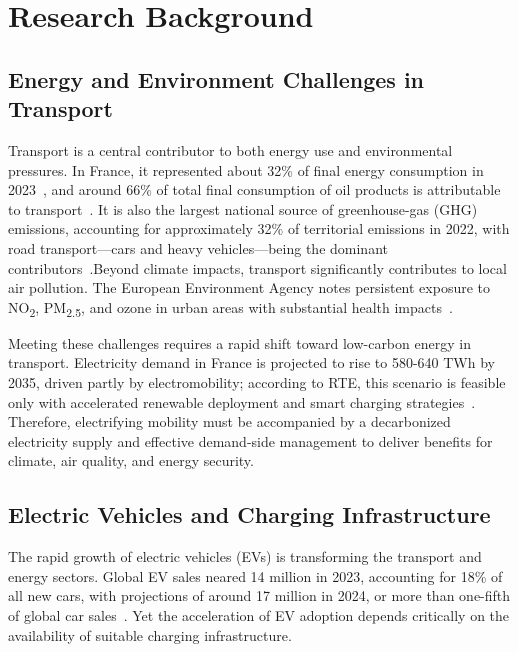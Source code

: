 \section{Research Background}

\subsection{Energy and Environment Challenges in Transport}

Transport is a central contributor to both energy use and environmental pressures. In France, it represented about 32\% of final energy consumption in 2023~\cite{IEA2025_FranceEnergy}, and around 66\% of total final consumption of oil products is attributable to transport~\cite{IEA2025_FranceOil}. It is also the largest national source of greenhouse-gas (GHG) emissions, accounting for approximately 32\% of territorial emissions in 2022, with road transport—cars and heavy vehicles—being the dominant contributors~\cite{HCC2023_GHG}.Beyond climate impacts, transport significantly contributes to local air pollution. The European Environment Agency notes persistent exposure to NO\textsubscript{2}, PM\textsubscript{2.5}, and ozone in urban areas with substantial health impacts~\cite{EEA2024_AirPollution}. 

Meeting these challenges requires a rapid shift toward low-carbon energy in transport. Electricity demand in France is projected to rise to 580-640 TWh by 2035, driven partly by electromobility; according to RTE, this scenario is feasible only with accelerated renewable deployment and smart charging strategies~\cite{RTE2023_Demand2035}. Therefore, electrifying mobility must be accompanied by a decarbonized electricity supply and effective demand-side management to deliver benefits for climate, air quality, and energy security.



\subsection{Electric Vehicles and Charging Infrastructure}

The rapid growth of electric vehicles (EVs) is transforming the transport and 
energy sectors. Global EV sales neared 14 million in 2023, accounting for 18\% of 
all new cars, with projections of around 17 million in 2024, or more than one-fifth 
of global car sales~\cite{IEA2024}. Yet the acceleration of EV adoption depends 
critically on the availability of suitable charging infrastructure.

